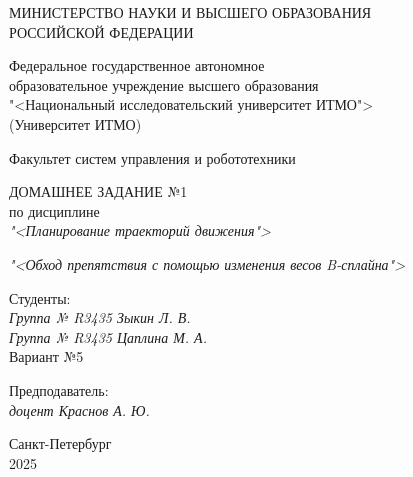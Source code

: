 \thispagestyle{empty}

\begin{center}
    МИНИСТЕРСТВО НАУКИ И ВЫСШЕГО ОБРАЗОВАНИЯ \\ РОССИЙСКОЙ ФЕДЕРАЦИИ

    \vspace{20pt}

    Федеральное государственное автономное \\ образовательное учреждение высшего образования \\
    "<Национальный исследовательский университет ИТМО"> \\
    (Университет ИТМО)

    \vspace{20pt}

    Факультет систем управления и робототехники
\end{center}

\vfill

\begin{center}
    ДОМАШНЕЕ ЗАДАНИЕ №1\\
    по дисциплине \\
    \textit{"<Планирование траекторий движения">}

    \vspace{20pt}

    \textit{"<Обход препятствия с помощью изменения весов B-сплайна">}
    
\end{center}

\vfill

    \noindent Студенты: \\
    \textit{Группа № R3435 \hfill Зыкин Л. В.} \\
    \textit{Группа № R3435 \hfill Цаплина М. А.} \\
    \noindent Вариант №5

    \vspace{20pt}

    \noindent Предподаватель: \\
    \textit{доцент \hfill Краснов А. Ю.}

\vfill

\begin{center}
    Санкт-Петербург \\ 2025
\end{center}

